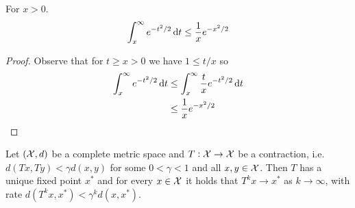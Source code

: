 
\begin{lem} For $x > 0$.
  \[ \int_x^\infty e^{-t^2/2} \dif t \leq \frac{1}{x} e^{-x^2/2} \]
  \label{lem:normtail}
\end{lem}

\begin{proof}
  Observe that for $t \geq x > 0$ we have $1 \leq t/x$ so
  \begin{align*}
    \int_x^\infty e^{-t^2/2} \dif t
    &\leq \int_x^\infty \frac{t}{x} e^{-t^2/2} \dif t
    \\ &\leq \frac{1}{x} e^{-x^2/2}
  \end{align*}
\end{proof}


\begin{thm}
  Let $(\mathcal{X}, d)$ be a complete metric space
  and $T:\mathcal{X} \to \mathcal{X}$ be a contraction,
  i.e. $d(Tx, Ty)<\gamma d(x, y)$ for some $0 < \gamma < 1$
  and all $x,y \in \mathcal{X}$.
  Then $T$ has a unique fixed point $x^*$ and for every $x\in \mathcal{X}$
  it holds that $T^k x \to x^*$ as $k \to \infty$, with rate
  $d(T^k x, x^*) < \gamma^k d(x, x^*)$.
\end{thm}
